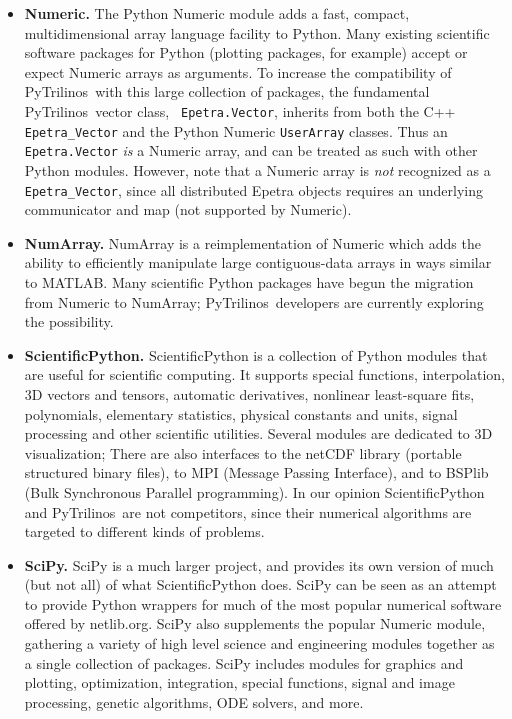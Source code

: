 \documentclass[acmtocl]{acmtrans2m}
\newcommand{\PyTrilinos}{{PyTrilinos}}
\begin{document}
\begin{itemize}

\item {\bf Numeric.} The Python Numeric module adds a fast, compact,
  multidimensional array language facility to Python.  Many existing
  scientific software packages for Python (plotting packages, for
  example) accept or expect Numeric arrays as arguments.  To increase
  the compatibility of \PyTrilinos\ with this large collection of
  packages, the fundamental \PyTrilinos\ vector class, {\tt
    Epetra.Vector}, inherits from both the C++ {\tt Epetra\_Vector}
  and the Python Numeric {\tt UserArray} classes.  Thus an {\tt
    Epetra.Vector} {\sl is} a Numeric array, and can be treated as
  such with other Python modules.  However, note that a Numeric array
  is {\sl not} recognized as a {\tt Epetra\_Vector}, since all
  distributed Epetra objects requires an underlying communicator and
  map (not supported by Numeric).

\item {\bf NumArray.}  NumArray is a reimplementation of Numeric which
  adds the ability to efficiently manipulate large contiguous-data
  arrays in ways similar to MATLAB.  Many scientific Python packages
  have begun the migration from Numeric to NumArray;
  \PyTrilinos\ developers are currently exploring the possibility.

\item {\bf ScientificPython.}  ScientificPython is a collection of
  Python modules that are useful for scientific computing.  It
  supports special functions, interpolation, 3D vectors and tensors,
  automatic derivatives, nonlinear least-square fits, polynomials,
  elementary statistics, physical constants and units, signal
  processing and other scientific utilities.  Several modules are
  dedicated to 3D visualization; There are also interfaces to the
  netCDF library (portable structured binary files), to MPI (Message
  Passing Interface), and to BSPlib (Bulk Synchronous Parallel
  programming).  In our opinion ScientificPython and \PyTrilinos\ are
  not competitors, since their numerical algorithms are targeted to
  different kinds of problems.

\item {\bf SciPy.} SciPy is a much larger project, and provides its
  own version of much (but not all) of what ScientificPython does.
  SciPy can be seen as an attempt to provide Python wrappers for much
  of the most popular numerical software offered by netlib.org.  SciPy
  also supplements the popular Numeric module, gathering a variety of
  high level science and engineering modules together as a single
  collection of packages.  SciPy includes modules for graphics and
  plotting, optimization, integration, special functions, signal and
  image processing, genetic algorithms, ODE solvers, and more.
  

\end{itemize}
\end{document}
